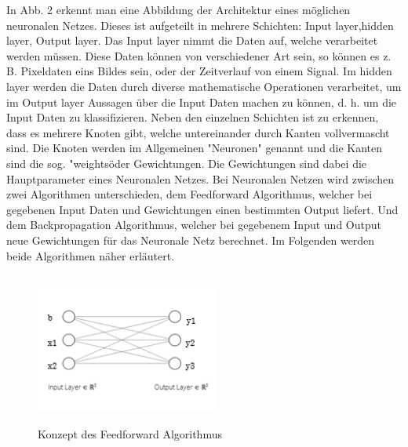 In Abb. 2 erkennt man eine Abbildung der Architektur eines möglichen neuronalen Netzes. Dieses ist aufgeteilt in mehrere Schichten: Input layer,hidden layer, Output layer. Das Input layer nimmt die Daten auf, welche verarbeitet werden müssen. Diese Daten können von verschiedener Art sein, so können es z. B. Pixeldaten eins Bildes sein, oder der Zeitverlauf von einem Signal. Im hidden layer werden die Daten durch diverse mathematische Operationen verarbeitet, um im Output layer Aussagen über die Input Daten machen zu können, d. h. um die Input Daten zu klassifizieren. Neben den einzelnen Schichten ist zu erkennen, dass es mehrere Knoten gibt, welche untereinander durch Kanten vollvermascht sind. Die Knoten werden im Allgemeinen "Neuronen" genannt und die Kanten sind die sog. "weights\" oder Gewichtungen. Die Gewichtungen sind dabei die Hauptparameter eines Neuronalen Netzes. Bei Neuronalen Netzen wird zwischen zwei Algorithmen unterschieden, dem Feedforward Algorithmus, welcher bei gegebenen Input Daten und Gewichtungen einen bestimmten Output liefert. Und dem Backpropagation Algorithmus, welcher bei gegebenem Input und Output neue Gewichtungen für das Neuronale Netz berechnet. Im Folgenden werden beide Algorithmen näher erläutert. 



\begin{figure}[H]
    \centering
    \includegraphics[height= 5cm, width = 6cm]{Pictures/FF.png}
    \caption{Konzept des Feedforward Algorithmus }
    
\end{figure}


